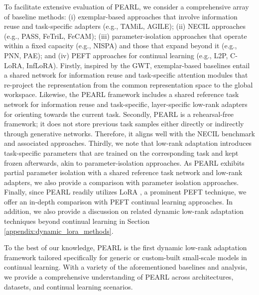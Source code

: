 \documentclass[10pt]{article} %
\begin{document}
To facilitate extensive evaluation of PEARL, we consider a comprehensive array of baseline methods: (i) exemplar-based approaches that involve information reuse and task-specific adapters (e.g., TAMiL, AGILE); (ii) NECIL approaches (e.g., PASS, FeTriL, FeCAM); (iii) parameter-isolation approaches that operate within a fixed capacity (e.g., NISPA) and those that expand beyond it (e.g., PNN, PAE); and (iv) PEFT approaches for continual learning (e.g., L2P, C-LoRA, InfLoRA).  Firstly, inspired by the GWT, exemplar-based baselines entail a shared network for information reuse and task-specific attention modules that re-project the representation from the common representation space to the global workspace. Likewise, the PEARL framework includes a shared reference task network for information reuse and task-specific, layer-specific low-rank adapters for orienting towards the current task.  Secondly, PEARL is a rehearsal-free framework; it does not store previous task samples either directly or indirectly through generative networks. Therefore, it aligns well with the NECIL benchmark and associated approaches. Thirdly, we note that low-rank adaptation introduces task-specific parameters that are trained on the corresponding task and kept frozen afterwards, akin to parameter-isolation approaches. As PEARL exhibits partial parameter isolation with a shared reference task network and low-rank adapters, we also provide a comparison with parameter isolation approaches. Finally, since PEARL readily utilizes LoRA \citep{hu2021lora}, a prominent PEFT technique, we offer an in-depth comparison with PEFT continual learning approaches. In addition, we also provide a discussion on related dynamic low-rank adaptation techniques beyond continual learning in Section \ref{appendix:dynamic_lora_methods}.

To the best of our knowledge, PEARL is the first dynamic low-rank adaptation framework tailored specifically for generic or custom-built small-scale models in continual learning. With a variety of the aforementioned baselines and analysis, we provide a comprehensive understanding of PEARL across architectures, datasets, and continual learning scenarios.
\end{document}
